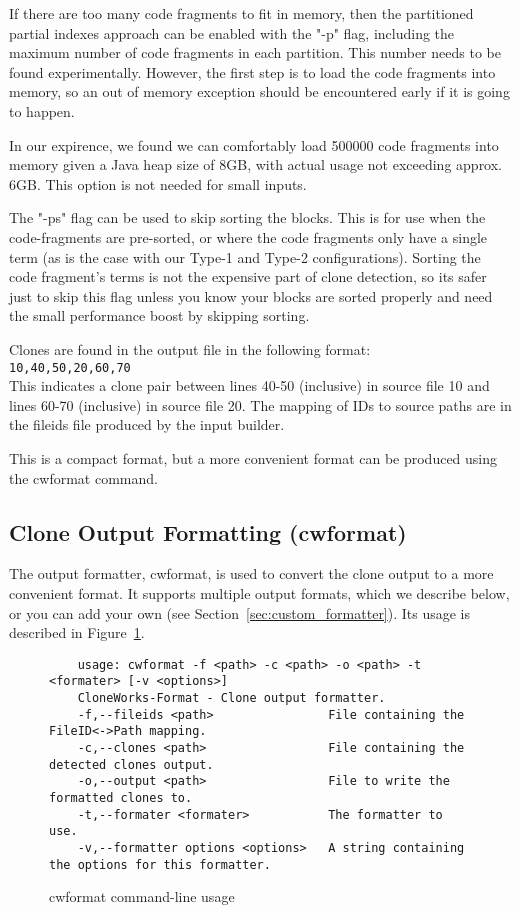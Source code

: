 \documentclass[]{article}
\begin{document}
	If there are too many code fragments to fit in memory, then the partitioned partial indexes approach can be enabled with the "-p" flag, including the maximum number of code fragments in each partition.  This number needs to be found experimentally.  However, the first step is to load the code fragments into memory, so an out of memory exception should be encountered early if it is going to happen.
	
	In our expirence, we found we can comfortably load 500000 code fragments into memory given a Java heap size of 8GB, with actual usage not exceeding approx. 6GB.  This option is not needed for small inputs.
	
	The "-ps" flag can be used to skip sorting the blocks.  This is for use when the	code-fragments are pre-sorted, or where the code fragments only have a single term (as is the case with our Type-1 and Type-2 configurations).  Sorting the code fragment's terms is not the expensive part of clone detection, so its safer just to skip this flag unless you know your blocks are sorted properly and need the small performance boost by skipping sorting.
	
	Clones are found in the output file in the following format:\\
	\noindent \verb|10,40,50,20,60,70|\\
	
	This indicates a clone pair between lines 40-50 (inclusive) in source file 10
	and lines 60-70 (inclusive) in source file 20.  The mapping of IDs to source
	paths are in the fileids file produced by the input builder.
	
	This is a compact format, but a more convenient format can be produced using the cwformat command.
	
	\subsection{Clone Output Formatting (cwformat)}

	The output formatter, cwformat, is used to convert the clone output to a more convenient format.  It supports multiple output formats, which we describe below, or you can add your own (see Section~\ref{sec:custom_formatter}).  Its usage is described in Figure~\ref{fig:cwformatuse}.
	
	\begin{figure}
	\caption{cwformat command-line usage}\label{fig:cwformatuse}
	\begin{verbatim}
	usage: cwformat -f <path> -c <path> -o <path> -t <formater> [-v <options>]
	CloneWorks-Format - Clone output formatter.
	-f,--fileids <path>                File containing the FileID<->Path mapping.
	-c,--clones <path>                 File containing the detected clones output.
	-o,--output <path>                 File to write the formatted clones to.
	-t,--formater <formater>           The formatter to use.
	-v,--formatter options <options>   A string containing the options for this formatter.
	\end{verbatim}
	\end{figure}
	
\end{document}
